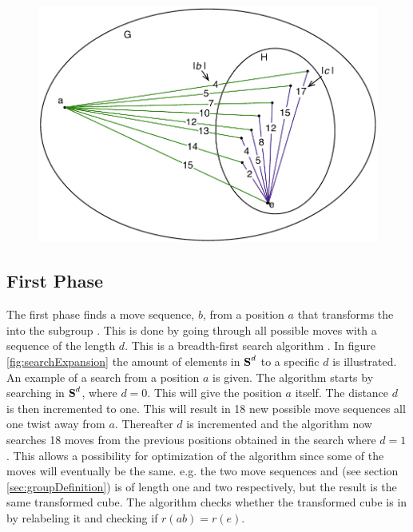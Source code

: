 \begin{figure}[!htb]
	\centering
	\includegraphics[scale=0.75]{input/pics/kocieambe2.pdf}
	\caption{}
	\label{fig:kociemba2}
\end{figure}

\subsection{First Phase}
\label{sub:firstPhase}
The first phase finds a move sequence, $b$, from a position $a$ that transforms the \rubik{} into the subgroup . 
This is done by going through all possible moves with a sequence of the length $d$. 
This is a breadth-first search algorithm \cite[pp. 729-731]{Rosen07}.
In figure \ref{fig:searchExpansion} the amount of elements in $\textbf{S}^d$ to a specific $d$ is illustrated.
An example of a search from a position $a$ is given. The algorithm starts by searching in $\textbf{S}^{d}$, where $d =  0$. This will give the position $a$ itself. The distance $d$ is then incremented to one. 
This will result in 18 new possible move sequences all one twist away from $a$. 
Thereafter $d$ is incremented and the algorithm now searches 18 moves from the previous positions obtained in the search where $d = 1$. 
This allows a possibility for optimization of the algorithm since some of the moves will eventually be the same. e.g. the two move sequences  and  (see section \ref{sec:groupDefinition}) is of length one and two respectively, but the result is the same transformed cube. The algorithm checks whether the transformed cube is in  by relabeling it and checking if $r(ab) = r(e)$. 


